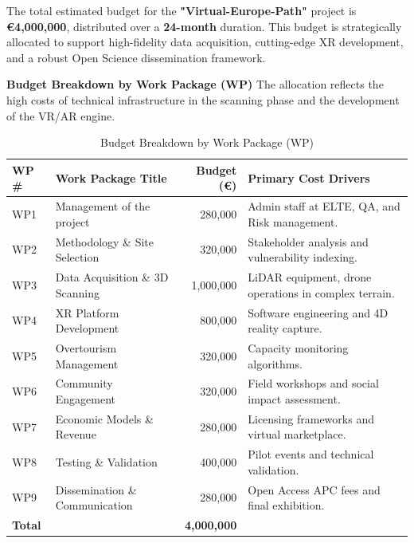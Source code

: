 The total estimated budget for the \textbf{"Virtual-Europe-Path"} project is \textbf{€4,000,000}, distributed over a \textbf{24-month} duration. This budget is strategically allocated to support high-fidelity data acquisition, cutting-edge XR development, and a robust Open Science dissemination framework.

\textbf{Budget Breakdown by Work Package (WP)}
The allocation reflects the high costs of technical infrastructure in the scanning phase and the development of the VR/AR engine.
\begin{table}[h!]
    \centering
    \caption{Budget Breakdown by Work Package (WP)}
    \label{tab:wp_budget}
    \begin{tabular}{|l|p{5cm}|r|p{5cm}|}
        \hline
        \textbf{WP \#} & \textbf{Work Package Title} & \textbf{Budget (€)} & \textbf{Primary Cost Drivers} \\ \hline
        WP1 & Management of the project & 280,000 & Admin staff at ELTE, QA, and Risk management. \\ \hline
        WP2 & Methodology \& Site Selection & 320,000 & Stakeholder analysis and vulnerability indexing. \\ \hline
        WP3 & Data Acquisition \& 3D Scanning & 1,000,000 & LiDAR equipment, drone operations in complex terrain. \\ \hline
        WP4 & XR Platform Development & 800,000 & Software engineering and 4D reality capture. \\ \hline
        WP5 & Overtourism Management & 320,000 & Capacity monitoring algorithms. \\ \hline
        WP6 & Community Engagement & 320,000 & Field workshops and social impact assessment. \\ \hline
        WP7 & Economic Models \& Revenue & 280,000 & Licensing frameworks and virtual marketplace. \\ \hline
        WP8 & Testing \& Validation & 400,000 & Pilot events and technical validation. \\ \hline
        WP9 & Dissemination \& Communication & 280,000 & Open Access APC fees and final exhibition. \\ \hline
        \textbf{Total} & & \textbf{4,000,000} & \\ \hline
    \end{tabular}
\end{table}

